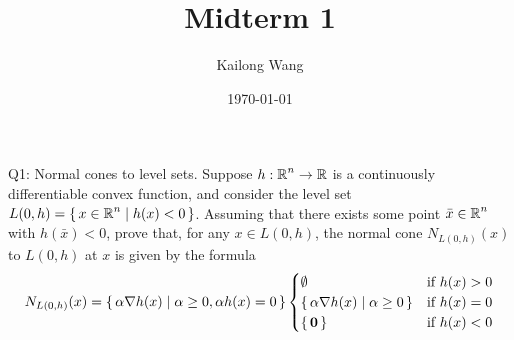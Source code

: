 \documentclass{article}
\title{Midterm 1}
\author{Kailong Wang}
\date{\today}
\begin{document}
\maketitle

\begin{problem}
    {Q1: Normal cones to level sets.}
    Suppose $h:\operatorname{\mathbb{R}}^n\rightarrow\operatorname{\mathbb{R}}$ is a continuously differentiable convex function, and consider the level set $L(0,h)=\left\lbrace\,x\in\operatorname{\mathbb{R}}^n\mid h(x)<0\,\right\rbrace$. Assuming that there exists some point $\bar{x}\in\operatorname{\mathbb{R}}^n$ with $h(\bar{x})<0$, prove that, for any $x\in L(0,h)$, the normal cone $N_{L(0,h)}(x)$ to $L(0,h)$ at $x$ is given by the formula
    \begin{align*}
        N_{L(0,h)}(x)=\left\lbrace\,\alpha\nabla h(x)\mid \alpha\geq 0, \alpha h(x)=0\,\right\rbrace
        \begin{cases}
            \emptyset & \text{if } h(x)>0 \\
            \left\lbrace\,\alpha\nabla h(x)\mid \alpha\geq 0\,\right\rbrace & \text{if } h(x)=0\\
            \left\lbrace\,\bm{0}\,\right\rbrace & \text{if } h(x)<0
        \end{cases}
    \end{align*}
\end{problem}
\end{document}
